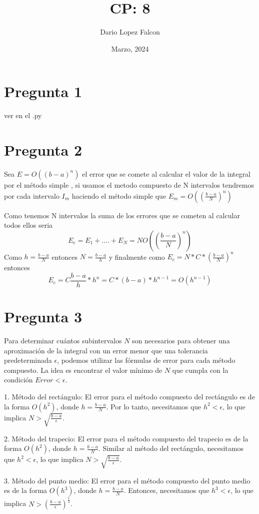 \documentclass[a4paper,12pt]{article}
\begin{document}
\title{CP: 8}
\author{Dario Lopez Falcon}
\date{Marzo, 2024}
\maketitle

\section*{Pregunta 1 }
ver en el .py
\section*{Pregunta 2}
Sea $E = O((b-a)^n)$ el error que se comete al calcular el valor de la integral por el método simple , si usamos 
el metodo compuesto de N intervalos tendremos por cada intervalo $I_m$ haciendo el método simple que $E_m = O((\frac{b-a}{N})^n)$

Como tenemos N intervalos la suma de los errores que se cometen al calcular todos ellos seria 
\[E_c = E_1+ .... + E_N = N O((\frac{b-a}{N})^n) \]
Como $h= \frac{b-a}{N}$ entonces $N= \frac{b-a}{h}$ y finalmente como $E_c= N*C*(\frac{b-a}{N})^n$ entonces 
\[E_c = C \frac{b-a}{h} * h^n = C*(b-a) * h^{n-1}= O(h^{n-1})\]

\section*{Pregunta 3}

Para determinar cuántos subintervalos \( N \) son necesarios para obtener una aproximación de la integral con un error menor que una tolerancia predeterminada \( \epsilon \), podemos utilizar las fórmulas de error para cada método compuesto. La idea es encontrar el valor mínimo de \( N \) que cumpla con la condición \( Error < \epsilon \).

1. Método del rectángulo:
   El error para el método compuesto del rectángulo es de la forma \( O(h^2) \), donde \( h = \frac{b - a}{N} \). Por lo tanto, necesitamos que \( h^2 < \epsilon \), lo que implica \( N > \sqrt{\frac{b - a}{\epsilon}} \).

2. Método del trapecio:
   El error para el método compuesto del trapecio es de la forma \( O(h^2) \), donde \( h = \frac{b - a}{N} \). Similar al método del rectángulo, necesitamos que \( h^2 < \epsilon \), lo que implica \( N > \sqrt{\frac{b - a}{\epsilon}} \).

3. Método del punto medio:
   El error para el método compuesto del punto medio es de la forma \( O(h^3) \), donde \( h = \frac{b - a}{N} \). Entonces, necesitamos que \( h^3 < \epsilon \), lo que implica \( N > \left(\frac{b - a}{\epsilon}\right)^{\frac{1}{3}} \).
\end{document}
